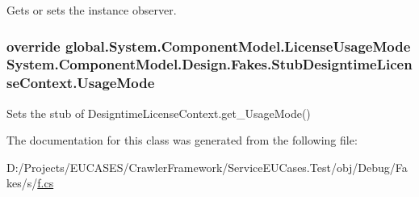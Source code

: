 Gets or sets the instance observer.

\hypertarget{class_system_1_1_component_model_1_1_design_1_1_fakes_1_1_stub_designtime_license_context_ad32361f1f9c4a1e8cc4cb7b681417f42}{
\subsubsection[{Usage\-Mode}]{\setlength{\rightskip}{0pt plus 5cm}override global.\-System.\-Component\-Model.\-License\-Usage\-Mode System.\-Component\-Model.\-Design.\-Fakes.\-Stub\-Designtime\-License\-Context.\-Usage\-Mode\hspace{0.3cm}{\ttfamily [get]}}}\label{class_system_1_1_component_model_1_1_design_1_1_fakes_1_1_stub_designtime_license_context_ad32361f1f9c4a1e8cc4cb7b681417f42}


Sets the stub of Designtime\-License\-Context.\-get\-\_\-\-Usage\-Mode()



The documentation for this class was generated from the following file\-:\begin{DoxyCompactItemize}
\item 
D\-:/\-Projects/\-E\-U\-C\-A\-S\-E\-S/\-Crawler\-Framework/\-Service\-E\-U\-Cases.\-Test/obj/\-Debug/\-Fakes/s/\hyperlink{s_2f_8cs}{f.\-cs}\end{DoxyCompactItemize}
